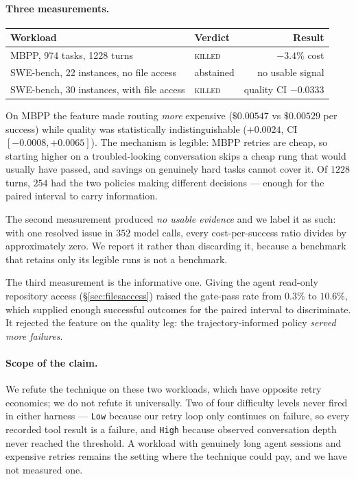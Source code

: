 \documentclass[11pt]{article}
\begin{document}
\paragraph{Three measurements.}

\begin{center}
\begin{tabular}{llr}
\toprule
Workload & Verdict & Result \\
\midrule
MBPP, 974 tasks, 1228 turns & \textsc{killed} & $-3.4\%$ cost \\
SWE-bench, 22 instances, no file access & abstained & no usable signal \\
SWE-bench, 30 instances, with file access & \textsc{killed} & quality CI $-0.0333$ \\
\bottomrule
\end{tabular}
\end{center}

On MBPP the feature made routing \emph{more} expensive ($\$0.00547$ vs $\$0.00529$ per success)
while quality was statistically indistinguishable ($+0.0024$, CI $[-0.0008, +0.0065]$). The
mechanism is legible: MBPP retries are cheap, so starting higher on a troubled-looking conversation
skips a cheap rung that would usually have passed, and savings on genuinely hard tasks cannot cover
it. Of $1228$ turns, $254$ had the two policies making different decisions --- enough for the paired
interval to carry information.

The second measurement produced \emph{no usable evidence} and we label it as such: with one resolved
issue in $352$ model calls, every cost-per-success ratio divides by approximately zero. We report it
rather than discarding it, because a benchmark that retains only its legible runs is not a benchmark.

The third measurement is the informative one. Giving the agent read-only repository access
(\S\ref{sec:filesaccess}) raised the gate-pass rate from $0.3\%$ to $10.6\%$, which supplied enough
successful outcomes for the paired interval to discriminate. It rejected the feature on the quality
leg: the trajectory-informed policy \emph{served more failures}.

\paragraph{Scope of the claim.} We refute the technique on these two workloads, which have opposite
retry economics; we do not refute it universally. Two of four difficulty levels never fired in
either harness --- \texttt{Low} because our retry loop only continues on failure, so every recorded
tool result is a failure, and \texttt{High} because observed conversation depth never reached the
threshold. A workload with genuinely long agent sessions and expensive retries remains the setting
where the technique could pay, and we have not measured one.
\end{document}
